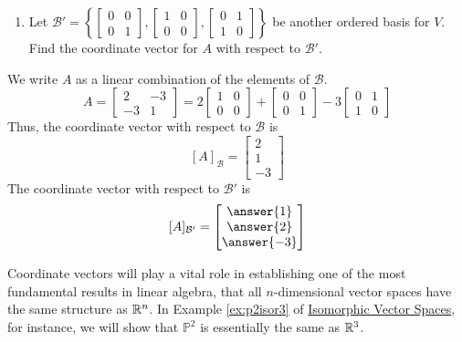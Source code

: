 \documentclass{ximera}
\begin{document}
\begin{example}
\begin{enumerate}
\item 
Let $\mathcal{B}'=\left\{
 \begin{bmatrix}
0 & 0 \\
0 & 1
\end{bmatrix}, 
\begin{bmatrix}
1 & 0 \\
0 & 0
\end{bmatrix},
\begin{bmatrix}
0 & 1 \\
1 & 0
\end{bmatrix}
\right\}$ be another ordered basis for $V$.  Find the coordinate vector for $A$ with respect to $\mathcal{B}'$.
\end{enumerate}
\begin{explanation}
We write $A$ as a linear combination of the elements of $\mathcal{B}$.
$$A=\begin{bmatrix}2&-3\\-3&1\end{bmatrix}=2\begin{bmatrix}1&0\\0&0\end{bmatrix}+\begin{bmatrix}
0 & 0 \\
0 & 1
\end{bmatrix}-3\begin{bmatrix}
0 & 1 \\
1 & 0
\end{bmatrix}$$
Thus, the coordinate vector with respect to $\mathcal{B}$ is
$$[A]_{\mathcal{B}}=\begin{bmatrix}2\\1\\-3\end{bmatrix}$$
The coordinate vector with respect to $\mathcal{B}'$ is
$$[A]_{\mathcal{B}'}=\begin{bmatrix}\answer{1}\\\answer{2}\\\answer{-3}\end{bmatrix}$$
\end{explanation}
\end{example}


Coordinate vectors will play a vital role in establishing one of the most fundamental results in linear algebra, that all $n$-dimensional vector spaces have the same structure as $\mathbb{R}^n$.  In Example \ref{ex:p2isor3} of \href{https://ximera.osu.edu/oerlinalg/LinearAlgebra/LTR-0060/main}{Isomorphic Vector Spaces}, for instance, we will show that $\mathbb{P}^2$ is essentially the same as $\mathbb{R}^3$.  
\end{document}
